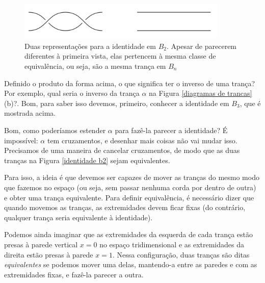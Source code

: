 \documentclass[a4paper,portuguese,11pt,twoside, leqno]{book}
\theoremstyle{definition}
\begin{document}
	\begin{figure}[H]
		
		\captionsetup{justification=centering}
		\begin{center}
			\includegraphics[width=10cm]{identidade_b2.png}
		\end{center}\caption{Duas representações para a identidade em $B_2$. Apesar de parecerem diferentes à primeira vista, elas pertencem à mesma classe de equivalência, ou seja, são a mesma trança em $B_n$}\label{identidade b2}
	\end{figure}
	
	\par\vspace{0.3cm} Definido o produto da forma acima, o que significa ter o inverso de uma trança? Por exemplo, qual seria o inverso da trança $\alpha$ na Figura \eqref{diagramas de trancas}(b)?. Bom, para saber isso devemos, primeiro, conhecer a identidade em $B_3$, que é mostrada acima.
	
	\par\vspace{0.3cm} Bom, como poderíamos estender $\alpha$ para fazê-la parecer a identidade? É impossível: $\alpha$ tem cruzamentos, e desenhar mais coisas não vai mudar isso. Precisamos de uma maneira de cancelar cruzamentos, de modo que as duas tranças na Figura \eqref{identidade b2} sejam equivalentes. 
	
	\par\vspace{0.3cm} Para isso, a ideia é que devemos ser capazes de mover as tranças do mesmo modo que fazemos no espaço (ou seja, sem passar nenhuma corda por dentro de outra) e obter uma trança equivalente. Para definir equivalência, é necessário dizer que quando movemos as tranças, as extremidades devem ficar fixas (do contrário, qualquer trança seria equivalente à identidade).
	
	\par\vspace{0.3cm} Podemos ainda imaginar que as extremidades da esquerda de cada trança estão presas à parede vertical $x=0$ no espaço tridimensional e as extremidades da direita estão presas à parede $x=1$. Nessa configuração, duas tranças são ditas \textit{equivalentes} se podemos mover uma delas, mantendo-a entre as paredes e com as extremidades fixas, e fazê-la parecer a outra. 
	
\end{document}
